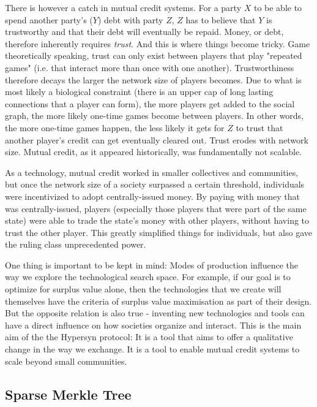\documentclass{article}
\begin{document}
There is however a catch in mutual credit systems. For a party $X$ to be able to spend another party's ($Y$) debt with party $Z$, $Z$ has to believe that $Y$ is trustworthy and that their debt will eventually be repaid. Money, or debt, therefore inherently requires \textit{trust}. And this is where things become tricky. Game theoretically speaking, trust can only exist between players that play "repeated games" (i.e. that interact more than once with one another). Trustworthiness therefore decays the larger the network size of players becomes. Due to what is most likely a biological constraint (there is an upper cap of long lasting connections that a player can form), the more players get added to the social graph, the more likely one-time games become between players. In other words, the more one-time games happen, the less likely it gets for $Z$ to trust that another player's credit can get eventually cleared out. Trust erodes with network size. Mutual credit, as it appeared historically, was fundamentally not scalable. 

As a technology, mutual credit worked in smaller collectives and communities, but once the network size of a society surpassed a certain threshold, individuals were incentivized to adopt centrally-issued money. By paying with money that was centrally-issued, players (especially those players that were part of the same state) were able to trade the state's money with other players, without having to trust the other player. This greatly simplified things for individuals, but also gave the ruling class unprecedented power. 

One thing is important to be kept in mind: Modes of production influence the way we explore the technological search space. For example, if our goal is to optimize for surplus value alone, then the technologies that we create will themselves have the criteria of surplus value maximisation as part of their design. But the opposite relation is also true - inventing new technologies and tools can have a direct influence on how societies organize and interact. This is the main aim of the the Hypersyn protocol: It is a tool that aims to offer a qualitative change in the way we exchange. It is a tool to enable mutual credit systems to scale beyond small communities.


\subsection{Sparse Merkle Tree}
\label{ss: sparse_merkle_tree}
\end{document}
